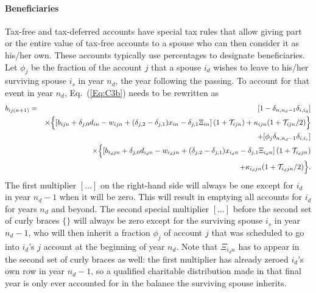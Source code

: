 \documentclass[fleqn,12pt]{report}
\begin{document}
\paragraph*{Beneficiaries}
Tax-free and tax-deferred accounts have special tax rules that allow giving part
or the entire value of
tax-free accounts to a spouse who can then consider it as his/her own.
These accounts typically use percentages to designate beneficiaries.
Let $\phi_j$ be the fraction of the account $j$ that a spouse $i_d$ wishes
to leave to his/her surviving spouse $i_s$
in year $n_d$, the year following the passing. 
To account for that event in year $n_d$, Eq.~(\ref{Eq:C3b}) needs to be rewritten as
\begin{eqnarray}
	b_{ij(n+1)} &=& [1 - \delta_{n, n_d-1}\delta_{i, i_d}] \nonumber \\
	&&\times \Bigl\{\left[b_{ijn} + \delta_{j, 0}d_{in} - w_{ijn}
	+ (\delta_{j, 2} - \delta_{j, 1})x_{in} - \delta_{j, 1}\Xi_{in}
	\right](1 + \mathcal{T}_{ijn})
	+ \kappa_{ijn}(1 + \mathcal{T}_{ijn}/2)
	\Bigr\}\nonumber \\
	&& + [\phi_j\delta_{n, n_d-1}\delta_{i, i_s}] \nonumber  \\
	&& \times \Bigl\{\left[b_{i_djn}
	+ \delta_{j, 0}d_{i_dn}
	- w_{i_djn}
	+ (\delta_{j, 2} - \delta_{j, 1})x_{i_dn}
	- \delta_{j, 1}\Xi_{i_dn}
	\right] (1 + \mathcal{T}_{i_djn})
	\nonumber\\
	&& + \kappa_{i_djn}(1 + \mathcal{T}_{i_djn}/2)
	\Bigr\}.
\end{eqnarray}
The first multiplier $[\ldots]$ on the right-hand side will always be one except for $i_d$ in
year $n_d-1$ when it will be zero. This will result in emptying all accounts for $i_d$ for years
$n_d$ and beyond.
The second special multiplier $[\ldots]$ before the second set of curly braces
$\{\}$ will always be zero except for the surviving
spouse $i_s$ in year $n_d-1$, who will then inherit a fraction $\phi_j$ of account $j$ that
was scheduled to go into $i_d$'s $j$ account at the beginning of year $n_d$.
Note that $\Xi_{i_dn}$ has to appear in the second set of curly braces as well: the
first multiplier has already zeroed $i_d$'s own row in year $n_d-1$, so a qualified
charitable distribution made in that final year is only ever accounted for in the
balance the surviving spouse inherits.
\end{document}
